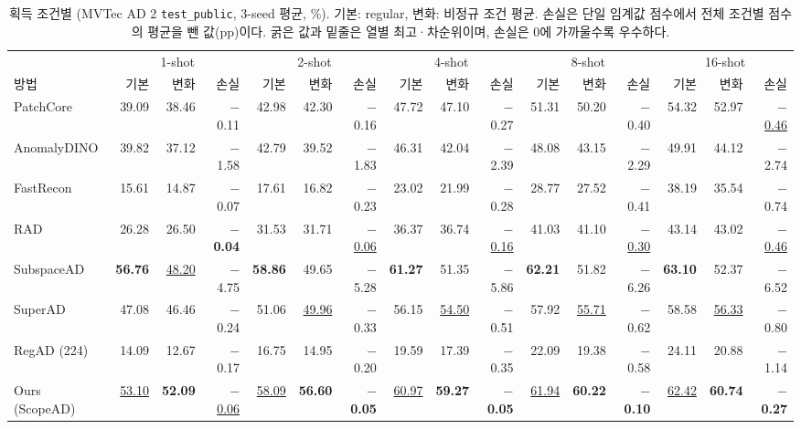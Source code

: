 \begin{table}[!tbp]
\centering\scriptsize\setlength{\tabcolsep}{2.6pt}
\caption{획득 조건별 \AUPRO{} (MVTec AD 2 \texttt{test\_public}, 3-seed 평균, \%). 기본: regular, 변화: 비정규 조건 평균. 손실은 단일 임계값 점수에서 전체 조건별 점수의 평균을 뺀 값(pp)이다. 굵은 값과 밑줄은 열별 최고·차순위이며, 손실은 0에 가까울수록 우수하다.}
\label{tab:condition_full}
\begin{tabular*}{\textwidth}{@{\extracolsep{\fill}}l*{15}{r}}
\toprule
& \multicolumn{3}{c}{1-shot} & \multicolumn{3}{c}{2-shot} & \multicolumn{3}{c}{4-shot} & \multicolumn{3}{c}{8-shot} & \multicolumn{3}{c}{16-shot} \\
\cmidrule(lr){2-4}\cmidrule(lr){5-7}\cmidrule(lr){8-10}\cmidrule(lr){11-13}\cmidrule(lr){14-16}
방법 & 기본 & 변화 & 손실 & 기본 & 변화 & 손실 & 기본 & 변화 & 손실 & 기본 & 변화 & 손실 & 기본 & 변화 & 손실 \\
\midrule
PatchCore & 39.09 & 38.46 & $-$0.11 & 42.98 & 42.30 & $-$0.16 & 47.72 & 47.10 & $-$0.27 & 51.31 & 50.20 & $-$0.40 & 54.32 & 52.97 & \underline{$-$0.46} \\
AnomalyDINO & 39.82 & 37.12 & $-$1.58 & 42.79 & 39.52 & $-$1.83 & 46.31 & 42.04 & $-$2.39 & 48.08 & 43.15 & $-$2.29 & 49.91 & 44.12 & $-$2.74 \\
FastRecon & 15.61 & 14.87 & $-$0.07 & 17.61 & 16.82 & $-$0.23 & 23.02 & 21.99 & $-$0.28 & 28.77 & 27.52 & $-$0.41 & 38.19 & 35.54 & $-$0.74 \\
RAD & 26.28 & 26.50 & \textbf{$-$0.04} & 31.53 & 31.71 & \underline{$-$0.06} & 36.37 & 36.74 & \underline{$-$0.16} & 41.03 & 41.10 & \underline{$-$0.30} & 43.14 & 43.02 & \underline{$-$0.46} \\
SubspaceAD & \textbf{56.76} & \underline{48.20} & $-$4.75 & \textbf{58.86} & 49.65 & $-$5.28 & \textbf{61.27} & 51.35 & $-$5.86 & \textbf{62.21} & 51.82 & $-$6.26 & \textbf{63.10} & 52.37 & $-$6.52 \\
SuperAD & 47.08 & 46.46 & $-$0.24 & 51.06 & \underline{49.96} & $-$0.33 & 56.15 & \underline{54.50} & $-$0.51 & 57.92 & \underline{55.71} & $-$0.62 & 58.58 & \underline{56.33} & $-$0.80 \\
RegAD (224) & 14.09 & 12.67 & $-$0.17 & 16.75 & 14.95 & $-$0.20 & 19.59 & 17.39 & $-$0.35 & 22.09 & 19.38 & $-$0.58 & 24.11 & 20.88 & $-$1.14 \\
Ours (ScopeAD) & \underline{53.10} & \textbf{52.09} & \underline{$-$0.06} & \underline{58.09} & \textbf{56.60} & \textbf{$-$0.05} & \underline{60.97} & \textbf{59.27} & \textbf{$-$0.05} & \underline{61.94} & \textbf{60.22} & \textbf{$-$0.10} & \underline{62.42} & \textbf{60.74} & \textbf{$-$0.27} \\
\bottomrule
\end{tabular*}
\end{table}

